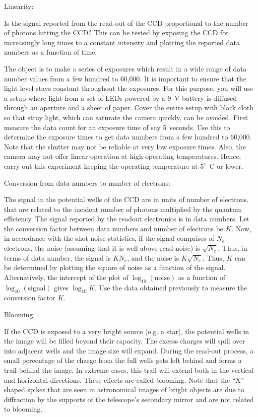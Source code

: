 \documentclass[a4paper,12pt]{article}
\begin{document}
\begin{enumerate}
{\bf \item Linearity:} Is the signal reported from the read-out of the CCD proportional to the number of photons hitting the CCD? This can be tested by exposing the CCD for increasingly long times to a constant intensity and plotting the reported data numbers as a function of time. 

The object is to make a series of exposures which result in a wide range of data number values from a few hundred to 60,000. It is important to ensure that the light level stays constant throughout the exposures. For this purpose, you will use a setup where light from a set of LEDs powered by a 9~V battery is diffused through an aperture and a sheet of paper. Cover the entire setup with black cloth so that stray light, which can saturate the camera quickly, can be avoided. First measure the data count for an exposure time of say 5~seconds. Use this to determine the exposure times to get data numbers from a few hundred to 60,000. Note that the shutter may not be reliable at very low exposure times. Also, the camera may not offer linear operation at high operating temperatures. Hence, carry out this experiment keeping the operating temperature at $5^\circ$~C or lower.

{\bf \item Conversion from data numbers to number of electrons:} The signal in the potential wells of the CCD are in units of number of electrons, that are related to the incident number of photons multiplied by the quantum efficiency. The signal reported by the readout electronics is in data numbers. Let the conversion factor between data numbers and number of electrons be $K$. Now, in accordance with the shot noise statistics, if the signal comprises of $N_e$ electrons, the noise (assuming that it is well above read noise) is $\sqrt{N_e}$. Thus, in terms of data number, the signal is $KN_e$, and the noise is $K\sqrt{N_e}$. Thus, $K$ can be determined by plotting the square of noise as a function of the signal. Alternatively, the intercept of the plot of $\log_{10}(\mathrm{noise})$ as a function of $\log_{10}(\mathrm{signal})$ gives $\log_{10}K$. Use the data obtained previously to measure the conversion factor $K$.

{\bf \item Blooming:} If the CCD is exposed to a very bright source (e.g. a star), the potential wells in the image will be filled beyond their capacity. The excess charges will spill over into adjacent wells and the image size will expand. During the read-out process, a small percentage of the charge from the full wells gets left behind and forms a trail behind the image. In extreme cases, this trail will extend both in the vertical and horizontal directions. These effects are called blooming. Note that the ``X'' shaped spikes that are seen in astronomical images of bright objects are due to diffraction by the supports of the telescope's secondary mirror and are not related to blooming.


\end{enumerate}
\end{document}
